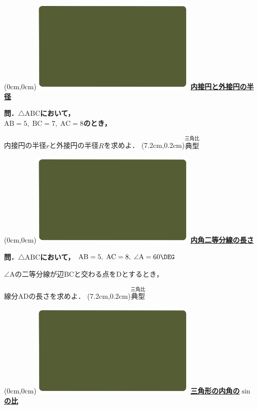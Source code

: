\documentclass[10pt,
fleqn,
dvipdfmx,
uplatex
]{jsarticle}
\begin{document}
\at(0cm,0cm){\includegraphics[width=8cm,bb=0 0 1920 1080]{./media_local/smart_background/三角比.jpeg}}
{\color{orange}\bf\boldmath\LARGE\underline{内接円と外接円の半径}}\vspace{0.3zw}

\large 
\bf\boldmath 問．$\triangle \text{ABC}$において，\\
\hfill $\text{AB}=5,\;\text{BC}=7,\;\text{AC}=8$のとき，

\huge
内接円の半径$r$と外接円の半径$R$を求めよ．
\at(7.2cm,0.2cm){\small\color{bradorange}$\overset{\text{三角比}}{\text{典型}}$}


\newpage



\at(0cm,0cm){\includegraphics[width=8cm,bb=0 0 1920 1080]{./media_local/smart_background/三角比.jpeg}}
{\color{orange}\bf\boldmath\LARGE\underline{内角二等分線の長さ}}\vspace{0.3zw}

\scriptsize 
\bf\boldmath 問．$\triangle \text{ABC}$において，
\small 
$\text{AB}=5,\;\text{AC}=8,\;\angle \text{A}={60}\DEG $

\LARGE
$\angle \text{A}$の二等分線が辺$\text{BC}$と交わる点を$\text{D}$とするとき，

\Large
\hfill 線分$\text{AD}$の長さを求めよ．
\at(7.2cm,0.2cm){\small\color{bradorange}$\overset{\text{三角比}}{\text{典型}}$}


\newpage



\at(0cm,0cm){\includegraphics[width=8cm,bb=0 0 1920 1080]{./media_local/smart_background/三角比.jpeg}}
{\color{orange}\bf\boldmath\Large\underline{三角形の内角の$\sin$の比}}\vspace{0.5zw}
\end{document}
